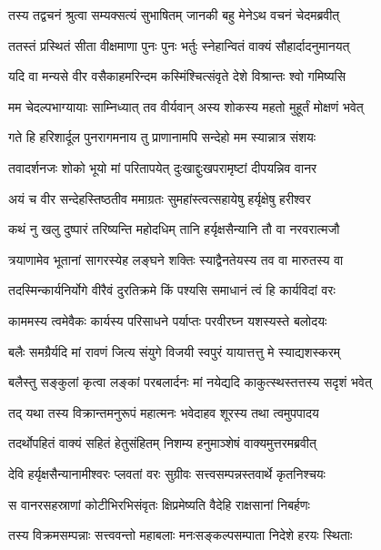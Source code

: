 \twolineshloka
{तस्य तद्वचनं श्रुत्वा सम्यक्सत्यं सुभाषितम्}
{जानकी बहु मेनेऽथ वचनं चेदमब्रवीत्} %

\twolineshloka
{ततस्तं प्रस्थितं सीता वीक्षमाणा पुनः पुनः}
{भर्तुः स्नेहान्वितं वाक्यं सौहार्दादनुमानयत्} %

\twolineshloka
{यदि वा मन्यसे वीर वसैकाहमरिन्दम}
{कस्मिंश्चित्संवृते देशे विश्रान्तः श्वो गमिष्यसि} %

\twolineshloka
{मम चेदल्पभाग्यायाः साम्निध्यात् तव वीर्यवान्}
{अस्य शोकस्य महतो मुहूर्तं मोक्षणं भवेत्} %

\twolineshloka
{गते हि हरिशार्दूल पुनरागमनाय तु}
{प्राणानामपि सन्देहो मम स्यान्नात्र संशयः} %

\twolineshloka
{तवादर्शनजः शोको भूयो मां परितापयेत्}
{दुःखाद्दुःखपरामृष्टां दीपयन्निव वानर} %

\twolineshloka
{अयं च वीर सन्देहस्तिष्ठतीव ममाग्रतः}
{सुमहांस्त्वत्सहायेषु हर्यृक्षेषु हरीश्वर} %

\twolineshloka
{कथं नु खलु दुष्पारं तरिष्यन्ति महोदधिम्}
{तानि हर्यृक्षसैन्यानि तौ वा नरवरात्मजौ} %

\twolineshloka
{त्रयाणामेव भूतानां सागरस्येह लङ्घने}
{शक्तिः स्याद्वैनतेयस्य तव वा मारुतस्य वा} %

\twolineshloka
{तदस्मिन्कार्यनिर्योगे वीरैवं दुरतिक्रमे}
{किं पश्यसि समाधानं त्वं हि कार्यविदां वरः} %

\twolineshloka
{काममस्य त्वमेवैकः कार्यस्य परिसाधने}
{पर्याप्तः परवीरघ्न यशस्यस्ते बलोदयः} %

\twolineshloka
{बलैः समग्रैर्यदि मां रावणं जित्य संयुगे}
{विजयी स्वपुरं यायात्तत्तु मे स्याद्यशस्करम्} %

\twolineshloka
{बलैस्तु सङ्कुलां कृत्वा लङ्कां परबलार्दनः}
{मां नयेद्यदि काकुत्स्थस्तत्तस्य सदृशं भवेत्} %

\twolineshloka
{तद् यथा तस्य विक्रान्तमनुरूपं महात्मनः}
{भवेदाहव शूरस्य तथा त्वमुपपादय} %

\twolineshloka
{तदर्थोपहितं वाक्यं सहितं हेतुसंहितम्}
{निशम्य हनुमाञ्शेषं वाक्यमुत्तरमब्रवीत्} %

\twolineshloka
{देवि हर्यृक्षसैन्यानामीश्वरः प्लवतां वरः}
{सुग्रीवः सत्त्वसम्पन्नस्तवार्थे कृतनिश्चयः} %

\twolineshloka
{स वानरसहस्राणां कोटीभिरभिसंवृतः}
{क्षिप्रमेष्यति वैदेहि राक्षसानां निबर्हणः} %

\twolineshloka
{तस्य विक्रमसम्पन्नाः सत्त्ववन्तो महाबलाः}
{मनःसङ्कल्पसम्पाता निदेशे हरयः स्थिताः} %

